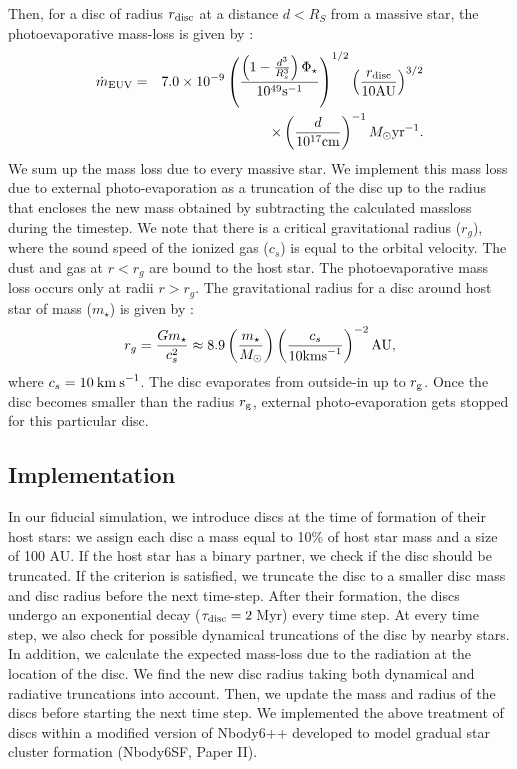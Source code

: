 \documentclass[fleqn,usenatbib]{mnras}
\newcommand\taudisc{\ensuremath{\tau_{\rm disc}}\xspace}  %
\begin{document}
Then, for a disc of radius $r_{\rm disc}$ at a distance $d < R_S$ from a massive star, the photoevaporative mass-loss is given by \citep{Hollenbach2000prpl.conf..401H}:
\begin{eqnarray}
    \dot{m}_{\rm EUV} &=& 7.0 \times 10^{-9} \left( \frac{ \left( 1-\frac{d^3}{R_s^3} \right) \Phi_\star}{10^{49} {\rm s}^{-1}} \right)^{1/2} 
    \left( \frac{r_{\rm disc}}{10 {\rm AU}} \right)^{3/2} \nonumber \\  & & \times \left(\frac{d}{10^{17} {\rm cm}} \right)^{-1} M_{\odot} {\rm yr}^{-1}. 
    \label{eqn:evaporationmasslossrate}
\end{eqnarray}
We sum up the mass loss due to every massive star. We implement this mass loss due to external photo-evaporation as a truncation of the disc up to the radius that encloses the new mass obtained by subtracting the calculated massloss during the timestep. We note that there is a critical gravitational radius ($r_{g}$), where the sound speed of the ionized gas ($c_s$) is equal to the orbital velocity. The dust and gas at $r < r_{g}$ are bound to the host star. The photoevaporative mass loss occurs only at radii $r > r_{g}$. The gravitational radius for a disc around host star of mass ($m_\star$) is given by \citep{armitage_astrophysics_2020}:
\begin{equation}
    r_{g} = \frac{Gm_\star}{c^2_{s}} \approx 8.9 \left(\frac{m_\star}{M_\odot}\right) \left(\frac{c_{s}}{10 {\rm km s}^{-1}}\right)^{-2} {\rm AU},
    \label{eqn:gravitationalradius}
\end{equation}
where $c_{s} = 10\: {\rm km\: s}^{-1}$. The disc evaporates from outside-in up to $r_{\rm g}$. Once the disc becomes smaller than the radius $r_{\rm g}$, external photo-evaporation gets stopped for this particular disc.   


\subsection{Implementation}
\label{subsec:implementation}
In our fiducial simulation, we introduce discs at the time of formation of their host stars: we assign each disc a mass equal to 10\% of host star mass and a size of 100 AU. If the host star has a binary partner, we check if the disc should be truncated. If the criterion is satisfied, we truncate the disc to a smaller disc mass and disc radius before the next time-step. After their formation, the discs undergo an exponential decay ($\taudisc=2\:$Myr) every time step. At every time step, we also check for possible dynamical truncations of the disc by nearby stars. In addition, we calculate the expected mass-loss due to the radiation at the location of the disc. We find the new disc radius taking both dynamical and radiative truncations into account. Then, we update the mass and radius of the discs before starting the next time step. We implemented the above treatment of discs within a modified version of Nbody6++ \citep{aarseth2003gravitational,Wang2015MNRAS.450.4070W} developed to model gradual star cluster formation (Nbody6SF, Paper II).
\end{document}
